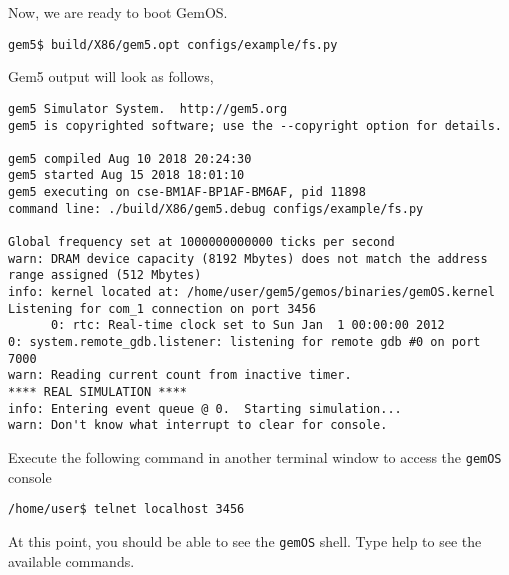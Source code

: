 \documentclass{article}
\begin{document}
\vspace{0.25cm}
\noindent
Now, we are ready to boot GemOS.

\vspace{0.25cm}
\noindent
\texttt{gem5\$ build/X86/gem5.opt configs/example/fs.py}

\vspace{0.25cm}
\noindent
Gem5 output will look as follows,
\begin{verbatim}
gem5 Simulator System.  http://gem5.org
gem5 is copyrighted software; use the --copyright option for details.

gem5 compiled Aug 10 2018 20:24:30
gem5 started Aug 15 2018 18:01:10
gem5 executing on cse-BM1AF-BP1AF-BM6AF, pid 11898
command line: ./build/X86/gem5.debug configs/example/fs.py

Global frequency set at 1000000000000 ticks per second
warn: DRAM device capacity (8192 Mbytes) does not match the address range assigned (512 Mbytes)
info: kernel located at: /home/user/gem5/gemos/binaries/gemOS.kernel
Listening for com_1 connection on port 3456
      0: rtc: Real-time clock set to Sun Jan  1 00:00:00 2012
0: system.remote_gdb.listener: listening for remote gdb #0 on port 7000
warn: Reading current count from inactive timer.
**** REAL SIMULATION ****
info: Entering event queue @ 0.  Starting simulation...
warn: Don't know what interrupt to clear for console.
\end{verbatim} 

\noindent
Execute the following command in another terminal window to access the \texttt{gemOS} console 

\vspace{0.25cm}
\noindent
\texttt{/home/user\$ telnet localhost 3456}


\vspace{0.25cm}
\noindent
At this point, you should be able to see the \texttt{gemOS} shell. Type help to see the available commands.
\end{document}
